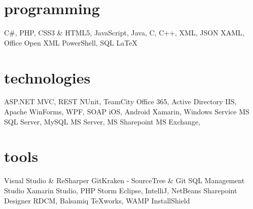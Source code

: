 \documentclass[a4paper]{cv-friggeri-x}
\begin{document}
%
%
%
%
\begin{asidebis}
\section{programming}
C\#, PHP, 
CSS3 \& HTML5, 
JavaScript, 
Java, C, C++,
XML, JSON
XAML, Office Open XML
PowerShell, SQL
LaTeX
%
\section{technologies}
ASP.NET MVC, REST
NUnit, TeamCity
Office 365, Active Directory
IIS, Apache
WinForms, WPF, SOAP
iOS, Android
Xamarin, Windows Service
MS SQL Server, MySQL
MS Server, MS Sharepoint
MS Exchange,
%
\section{tools}
Visual Studio \& ReSharper
GitKraken - SourceTree \& Git
SQL Management Studio
Xamarin Studio, PHP Storm
Eclipse, IntelliJ, NetBeans
Sharepoint Designer
RDCM, Balsamiq
TeXworks, WAMP
InstallShield
\end{asidebis}
%
%
\end{document}
